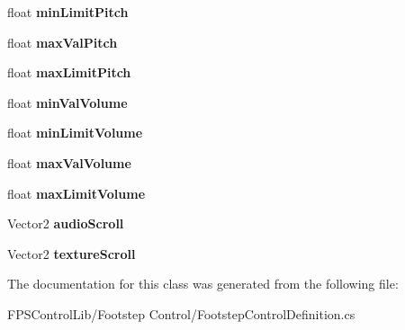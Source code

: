\begin{DoxyCompactItemize}
\item 
\hypertarget{class_f_p_s_control_1_1_footstep_control_definition_af2b28e3c406786b7a39cb566ff469474}{float {\bfseries min\-Limit\-Pitch}}\label{class_f_p_s_control_1_1_footstep_control_definition_af2b28e3c406786b7a39cb566ff469474}

\item 
\hypertarget{class_f_p_s_control_1_1_footstep_control_definition_a5d15ada06d1f281945c44180cd1349a9}{float {\bfseries max\-Val\-Pitch}}\label{class_f_p_s_control_1_1_footstep_control_definition_a5d15ada06d1f281945c44180cd1349a9}

\item 
\hypertarget{class_f_p_s_control_1_1_footstep_control_definition_aab2f6af5c8b9878a9d854af999f07371}{float {\bfseries max\-Limit\-Pitch}}\label{class_f_p_s_control_1_1_footstep_control_definition_aab2f6af5c8b9878a9d854af999f07371}

\item 
\hypertarget{class_f_p_s_control_1_1_footstep_control_definition_a9aa0cd118f74157e3d5da488dddc4613}{float {\bfseries min\-Val\-Volume}}\label{class_f_p_s_control_1_1_footstep_control_definition_a9aa0cd118f74157e3d5da488dddc4613}

\item 
\hypertarget{class_f_p_s_control_1_1_footstep_control_definition_ac69da1af3e236ffced3e6f3720be459a}{float {\bfseries min\-Limit\-Volume}}\label{class_f_p_s_control_1_1_footstep_control_definition_ac69da1af3e236ffced3e6f3720be459a}

\item 
\hypertarget{class_f_p_s_control_1_1_footstep_control_definition_a7cdcbd9919466c10760acd9e19a398ee}{float {\bfseries max\-Val\-Volume}}\label{class_f_p_s_control_1_1_footstep_control_definition_a7cdcbd9919466c10760acd9e19a398ee}

\item 
\hypertarget{class_f_p_s_control_1_1_footstep_control_definition_afc79278b10426dba8cd935fc754b5337}{float {\bfseries max\-Limit\-Volume}}\label{class_f_p_s_control_1_1_footstep_control_definition_afc79278b10426dba8cd935fc754b5337}

\item 
\hypertarget{class_f_p_s_control_1_1_footstep_control_definition_a2e0bf9afc702e1f812af1a1368237ea7}{Vector2 {\bfseries audio\-Scroll}}\label{class_f_p_s_control_1_1_footstep_control_definition_a2e0bf9afc702e1f812af1a1368237ea7}

\item 
\hypertarget{class_f_p_s_control_1_1_footstep_control_definition_a4e76fda6b1fc083ed809861d4075d020}{Vector2 {\bfseries texture\-Scroll}}\label{class_f_p_s_control_1_1_footstep_control_definition_a4e76fda6b1fc083ed809861d4075d020}

\end{DoxyCompactItemize}


The documentation for this class was generated from the following file\-:\begin{DoxyCompactItemize}
\item 
F\-P\-S\-Control\-Lib/\-Footstep Control/Footstep\-Control\-Definition.\-cs\end{DoxyCompactItemize}
